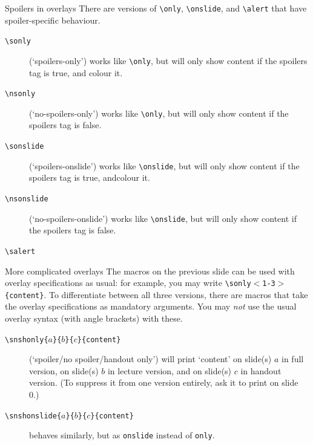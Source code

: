 \documentclass[10pt]{beamer}
\begin{document}
\begin{frame}{Spoilers in overlays}
There are versions of \texttt{\textbackslash only}, \texttt{\textbackslash onslide}, and \texttt{\textbackslash alert} that have spoiler-specific behaviour.
\begin{description}
\item[\texttt{\textbackslash sonly}] \textcolor{spoilercolor}{(`spoilers-only') works like \texttt{\textbackslash only}, but will only show content if the spoilers tag is true, and colour it}.
\item[\texttt{\textbackslash nsonly}] (`no-spoilers-only') works like \texttt{\textbackslash only}, but will only show content if the spoilers tag is false.
\item[\texttt{\textbackslash sonslide}]  \textcolor{spoilercolor}{(`spoilers-onslide') works like \texttt{\textbackslash onslide}, but will only show content if the spoilers tag is true, andcolour it}.
\item[\texttt{\textbackslash nsonslide}] (`no-spoilers-onslide') works like \texttt{\textbackslash onslide}, but will only show content if the spoilers tag is false.
\item[\texttt{\textbackslash salert}] 
\end{description}

\end{frame}
\begin{frame}{More complicated overlays}
The macros on the previous slide can be used with overlay specifications as usual: for example, you may write \texttt{\textbackslash sonly$<$1-3$>$\{content\}}. 
\vfill
To differentiate between all three versions, there are macros that take the overlay specifications as mandatory arguments. You may \textit{not} use the usual overlay syntax (with angle brackets) with these.
\begin{description}
\item[\texttt{\textbackslash snshonly\{$a$\}\{$b$\}\{$c$\}\{content\}}] (`spoiler/no spoiler/handout only') will print `content' on slide(s) $a$ in full version, on slide(s) $b$ in lecture version, and on slide(s) $c$ in handout version. (To suppress it from one version entirely, ask it to print on slide 0.)
\item[\texttt{\textbackslash snshonslide\{$a$\}\{$b$\}\{$c$\}\{content\}}] behaves similarly, but as \texttt{onslide} instead of \texttt{only}.
\end{description}
\end{frame}
\end{document}
